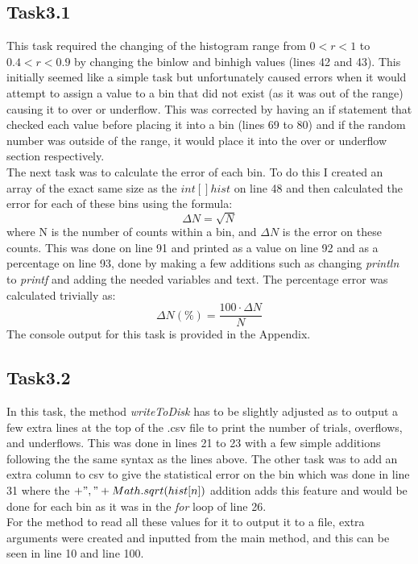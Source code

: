 \documentclass{article}
\begin{document}
\begin{multicols}{2}
	\subsection{Task3.1}
		This task required the changing of the histogram range from $0 < r < 1 $ to $0.4 < r <0.9 $ by changing the binlow and binhigh values (lines 42 and 43). This initially seemed like a simple task but unfortunately caused errors when it would attempt to assign a value to a bin that did not exist (as it was out of the range) causing it to over or underflow. This was corrected by having an if statement that checked each value before placing it into a bin (lines 69 to 80) and if the random number was outside of the range, it would place it into the over or underflow section respectively. \\ \indent The next task was to calculate the error of each bin. To do this I created an array of the exact same size as the $int [] hist$ on line 48 and then calculated the error for each of these bins using the formula:
		\begin{equation}
\Delta N = \sqrt{N}
		\end{equation}
		where N is the number of counts within a bin, and $\Delta N$ is the error on these counts. This was done on line 91 and printed as a value on line 92 and as a percentage on line 93, done by making a few additions such as changing \textit{println} to \textit{printf} and adding the needed variables and text. The percentage error was calculated trivially as:
		\begin{equation}
\Delta N(\%) = \dfrac{100 \cdot \Delta N}{N}
		\end{equation}
		The console output for this task is provided in the Appendix.
	\subsection{Task3.2}
		In this task, the method \textit{writeToDisk} has to be slightly adjusted as to output a few extra lines at the top of the .csv file to print the number of trials, overflows, and underflows. This was done in lines 21 to 23 with a few simple additions following the the same syntax as the lines above. The other task was to add an extra column to csv to give the statistical error on the bin which was done in line 31 where the $ +"," + Math.sqrt(hist[n]) $ addition adds this feature and would be done for each bin as it was in the \textit{for} loop of line 26. \\ \indent For the method to read all these values for it to output it to a file, extra arguments were created and inputted from the main method, and this can be seen in line 10 and line 100. 

\end{multicols}
\end{document}
